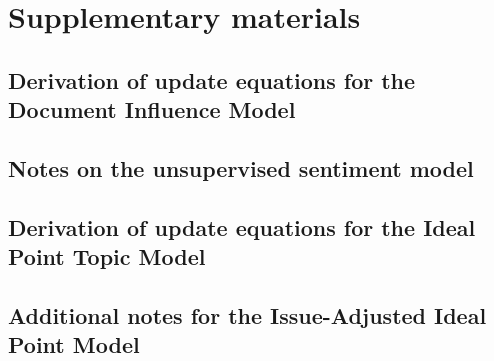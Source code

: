 \chapter{Supplementary materials}

\label{chapter:supplementary_materials}

\section{Derivation of update equations for the Document Influence Model}


\section{Notes on the unsupervised sentiment model}


\section{Derivation of update equations for the Ideal Point Topic Model}


\section{Additional notes for the Issue-Adjusted Ideal Point Model}






